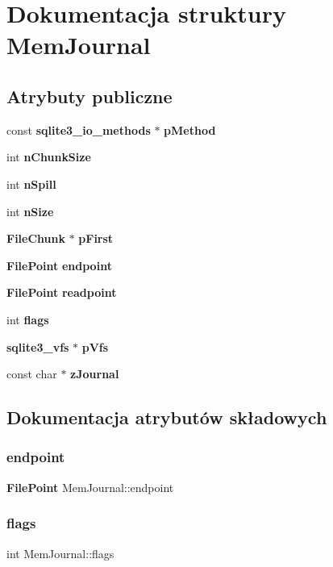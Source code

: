 \section{Dokumentacja struktury Mem\+Journal}
\label{struct_mem_journal}
\subsection*{Atrybuty publiczne}
\begin{DoxyCompactItemize}
\item 
const \textbf{ sqlite3\+\_\+io\+\_\+methods} $\ast$ \textbf{ p\+Method}
\item 
int \textbf{ n\+Chunk\+Size}
\item 
int \textbf{ n\+Spill}
\item 
int \textbf{ n\+Size}
\item 
\textbf{ File\+Chunk} $\ast$ \textbf{ p\+First}
\item 
\textbf{ File\+Point} \textbf{ endpoint}
\item 
\textbf{ File\+Point} \textbf{ readpoint}
\item 
int \textbf{ flags}
\item 
\textbf{ sqlite3\+\_\+vfs} $\ast$ \textbf{ p\+Vfs}
\item 
const char $\ast$ \textbf{ z\+Journal}
\end{DoxyCompactItemize}


\subsection{Dokumentacja atrybutów składowych}
\mbox{\label{struct_mem_journal_ac69637f95cfbce175cbeef00f71e59a9}} 
\subsubsection{endpoint}
{\footnotesize\ttfamily \textbf{ File\+Point} Mem\+Journal\+::endpoint}

\mbox{\label{struct_mem_journal_a1fcfbcbb9da77a5cefef038b1b846f35}} 
\subsubsection{flags}
{\footnotesize\ttfamily int Mem\+Journal\+::flags}

